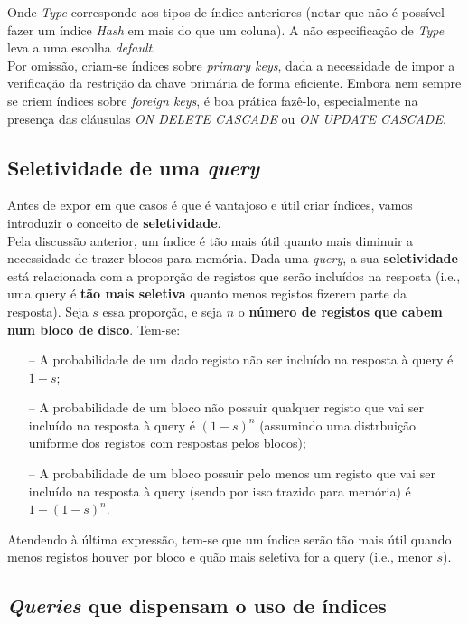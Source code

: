 \documentclass[oneside]{book}
\theoremstyle{definition}
\begin{document}
Onde \textit{Type} corresponde aos tipos de índice anteriores (notar que não é possível fazer um índice \textit{Hash} em mais do que um coluna). A não especificação de \textit{Type} leva a uma escolha \textit{default}. \\
Por omissão, criam-se índices sobre \textit{primary keys}, dada a necessidade de impor a verificação da restrição da chave primária de forma eficiente. Embora nem sempre se criem índices sobre \textit{foreign keys}, é boa prática fazê-lo, especialmente na presença das cláusulas \textit{ON DELETE CASCADE} ou \textit{ON UPDATE CASCADE}.

\subsection{Seletividade de uma \textit{query}}

Antes de expor em que casos é que é vantajoso e útil criar índices, vamos introduzir o conceito de \textbf{seletividade}.\\
Pela discussão anterior, um índice é tão mais útil quanto mais diminuir a necessidade de trazer blocos para memória. Dada uma \textit{query}, a sua \textbf{seletividade} está relacionada com a proporção de registos que serão incluídos na resposta (i.e., uma query é \textbf{tão mais seletiva} quanto menos registos fizerem parte da resposta). Seja $s$ essa proporção, e seja $n$ o \textbf{número de registos que cabem num bloco de disco}. Tem-se:

\begin{itemize}
    \itemsep0cm
    \item[--] A probabilidade de um dado registo não ser incluído na resposta à query é $1 - s$;
    \item[--] A probabilidade de um bloco não possuir qualquer registo que vai ser incluído na resposta à query é $(1-s)^n$ (assumindo uma distrbuição uniforme dos registos com respostas pelos blocos);
    \item[--] A probabilidade de um bloco possuir pelo menos um registo que vai ser incluído na resposta à query (sendo por isso trazido para memória) é $1 - (1-s)^n$.
\end{itemize}
Atendendo à última expressão, tem-se que um índice serão tão mais útil quando menos registos houver por bloco e quão mais seletiva for a query (i.e., menor $s$).

\subsection{\textit{Queries} que dispensam o uso de índices}
\end{document}
